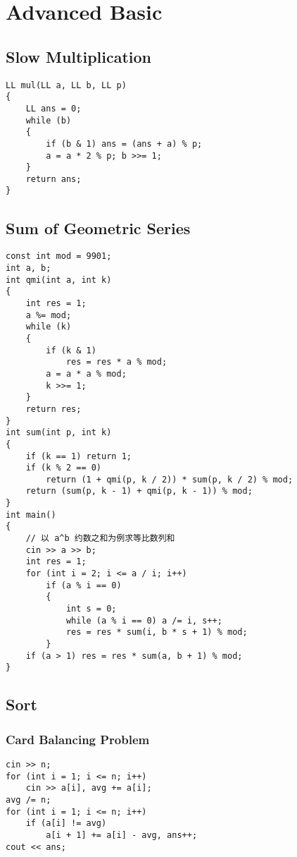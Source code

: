 \chapter{Advanced Basic}\label{chap:AdvancedBasic}
\section{Slow Multiplication}
\begin{lstlisting}
LL mul(LL a, LL b, LL p)
{
    LL ans = 0;
    while (b)
    {
        if (b & 1) ans = (ans + a) % p;
        a = a * 2 % p; b >>= 1;
    }
    return ans;
}
\end{lstlisting}
\section{Sum of Geometric Series}
\begin{lstlisting}
const int mod = 9901;
int a, b;
int qmi(int a, int k)
{
    int res = 1;
    a %= mod;
    while (k)
    {
        if (k & 1)
            res = res * a % mod;
        a = a * a % mod;
        k >>= 1;
    }
    return res;
}
int sum(int p, int k)
{
    if (k == 1) return 1;
    if (k % 2 == 0)
        return (1 + qmi(p, k / 2)) * sum(p, k / 2) % mod;
    return (sum(p, k - 1) + qmi(p, k - 1)) % mod;
}
int main()
{
    // 以 a^b 约数之和为例求等比数列和
    cin >> a >> b;
    int res = 1;
    for (int i = 2; i <= a / i; i++)
        if (a % i == 0)
        {
            int s = 0;
            while (a % i == 0) a /= i, s++;
            res = res * sum(i, b * s + 1) % mod;
        }
    if (a > 1) res = res * sum(a, b + 1) % mod;
}
\end{lstlisting}
\section{Sort}
\subsection{Card Balancing Problem}
\begin{lstlisting}
cin >> n;
for (int i = 1; i <= n; i++)
    cin >> a[i], avg += a[i];
avg /= n;
for (int i = 1; i <= n; i++)
    if (a[i] != avg)
        a[i + 1] += a[i] - avg, ans++;
cout << ans;
\end{lstlisting}
